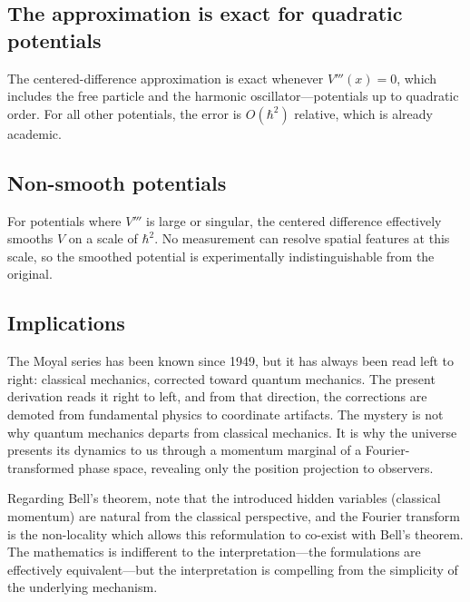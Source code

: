 \documentclass[prb,preprint]{revtex4-1}
\begin{document}
\subsection{The approximation is exact for quadratic potentials}

The centered-difference approximation is exact whenever $V'''(x) = 0$, which includes the free particle and the harmonic oscillator---potentials up to quadratic order.  For all other potentials, the error is $O(\hbar^2)$ relative, which is already academic.

\subsection{Non-smooth potentials}

For potentials where $V'''$ is large or singular, the centered difference effectively smooths $V$ on a scale of $\hbar^2$.  No measurement can resolve spatial features at this scale, so the smoothed potential is experimentally indistinguishable from the original.

\subsection{Implications}

The Moyal series has been known since 1949, but it has always been read left to right: classical mechanics, corrected toward quantum mechanics.  The present derivation reads it right to left, and from that direction, the corrections are demoted from fundamental physics to coordinate artifacts.  The mystery is not why quantum mechanics departs from classical mechanics.  It is why the universe presents its dynamics to us through a momentum marginal of a Fourier-transformed phase space, revealing only the position projection to observers.

Regarding Bell's theorem,\cite{bell1964,bell1987} note that the introduced hidden variables (classical momentum) are natural from the classical perspective, and the Fourier transform is the non-locality which allows this reformulation to co-exist with Bell's theorem.  The mathematics is indifferent to the interpretation---the formulations are effectively equivalent---but the interpretation is compelling from the simplicity of the underlying mechanism.
\end{document}
